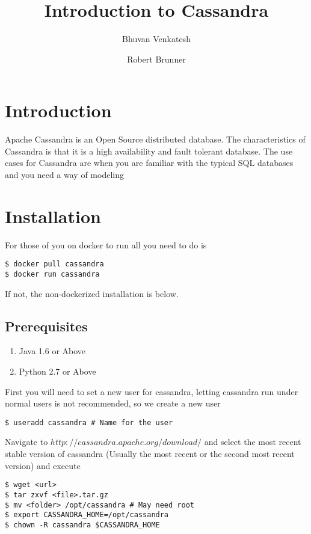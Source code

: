 \documentclass[9pt,twocolumn,twoside]{idsi}
\author[1]{Bhuvan Venkatesh}
\author[2]{Robert Brunner}
\affil[1]{National Center For Supercomputing Applications (NCSA)}
\affil[2]{Laboratory for Computation, Data, and Machine Learning}
\title{Introduction to Cassandra}
\begin{document}

\maketitle

\section{Introduction}

Apache Cassandra is an Open Source distributed database. The characteristics of Cassandra is that it is a high availability and fault tolerant database. The use cases for Cassandra are when you are familiar with the typical SQL databases and you need a way of modeling

\section{Installation}

For those of you on docker to run all you need to do is

\begin{lstlisting}[breaklines]
$ docker pull cassandra
$ docker run cassandra
\end{lstlisting}

If not, the non-dockerized installation is below.

\subsection{Prerequisites}
\begin{enumerate}
  \item Java 1.6 or Above
  \item Python 2.7 or Above
\end{enumerate}

First you will need to set a new user for cassandra, letting cassandra run under normal users is not recommended, so we create a new user

\begin{lstlisting}[breaklines]
$ useradd cassandra # Name for the user
\end{lstlisting}

Navigate to $http://cassandra.apache.org/download/$ and select the most recent stable version of cassandra (Usually the most recent or the second most recent version) and execute

\begin{lstlisting}[breaklines]
$ wget <url>
$ tar zxvf <file>.tar.gz
$ mv <folder> /opt/cassandra # May need root
$ export CASSANDRA_HOME=/opt/cassandra
$ chown -R cassandra $CASSANDRA_HOME
\end{lstlisting}
\end{document}
